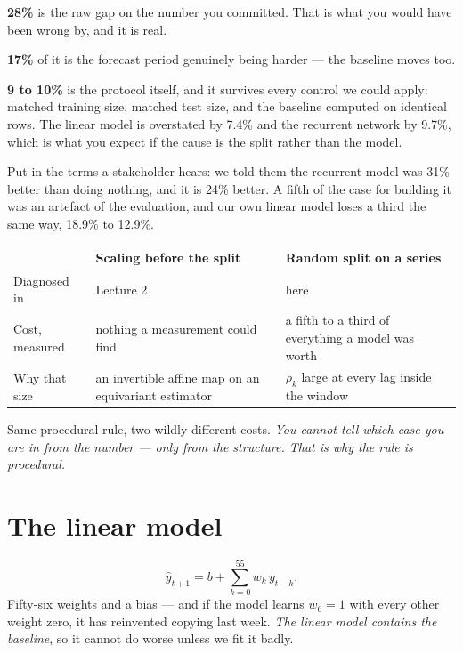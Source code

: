 \documentclass[11pt,a4paper]{article}
\begin{document}
\begin{keybox}[title={The honest verdict, in three numbers}]
\textbf{28\%} is the raw gap on the number you committed. That is what you
would have been wrong by, and it is real.

\textbf{17\%} of it is the forecast period genuinely being harder --- the
baseline moves too.

\textbf{9 to 10\%} is the protocol itself, and it survives every control we
could apply: matched training size, matched test size, and the baseline
computed on identical rows. The linear model is overstated by 7.4\% and the
recurrent network by 9.7\%, which is what you expect if the cause is the split
rather than the model.
\end{keybox}

Put in the terms a stakeholder hears: we told them the recurrent model was
31\% better than doing nothing, and it is 24\% better. A fifth of the case for
building it was an artefact of the evaluation, and our own linear model loses a
third the same way, 18.9\% to 12.9\%.

\begin{center}
\small
\begin{tabular}{p{}p{}p{}}
\toprule
& \textbf{Scaling before the split} & \textbf{Random split on a series} \\
\midrule
Diagnosed in & Lecture 2 & here \\
Cost, measured & nothing a measurement could find & a fifth to a third of
                                                    everything a model was
                                                    worth \\
Why that size & an invertible affine map on an equivariant estimator &
                $\rho_k$ large at every lag inside the window \\
\bottomrule
\end{tabular}
\end{center}

Same procedural rule, two wildly different costs. \emph{You cannot tell which
case you are in from the number --- only from the structure. That is why the
rule is procedural.}

\section{The linear model}

\[ \hat y_{t+1} = b + \sum_{k=0}^{55} w_k\,y_{t-k}. \]
Fifty-six weights and a bias --- and if the model learns $w_6 = 1$ with every
other weight zero, it has reinvented copying last week. \emph{The linear model
contains the baseline}, so it cannot do worse unless we fit it badly.
\end{document}
